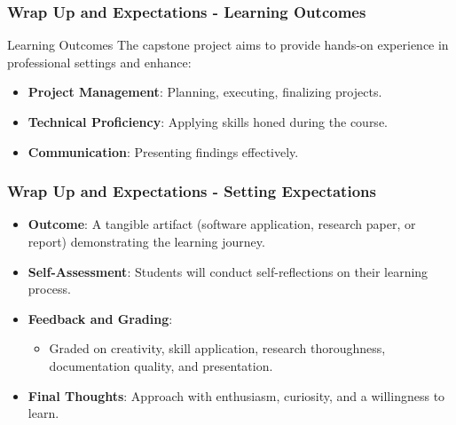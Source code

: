 \documentclass[aspectratio=169]{beamer}
\begin{document}
\begin{frame}[fragile]
    \frametitle{Wrap Up and Expectations - Learning Outcomes}
    \begin{block}{Learning Outcomes}
        The capstone project aims to provide hands-on experience in professional settings and enhance:
        \begin{itemize}
            \item \textbf{Project Management}: Planning, executing, finalizing projects.
            \item \textbf{Technical Proficiency}: Applying skills honed during the course.
            \item \textbf{Communication}: Presenting findings effectively.
        \end{itemize}
    \end{block}
\end{frame}

\begin{frame}[fragile]
    \frametitle{Wrap Up and Expectations - Setting Expectations}
    \begin{itemize}
        \item \textbf{Outcome}: A tangible artifact (software application, research paper, or report) demonstrating the learning journey.
        
        \item \textbf{Self-Assessment}: Students will conduct self-reflections on their learning process.
        
        \item \textbf{Feedback and Grading}:
        \begin{itemize}
            \item Graded on creativity, skill application, research thoroughness, documentation quality, and presentation.
        \end{itemize}
        
        \item \textbf{Final Thoughts}: Approach with enthusiasm, curiosity, and a willingness to learn.
    \end{itemize}
\end{frame}
\end{document}
